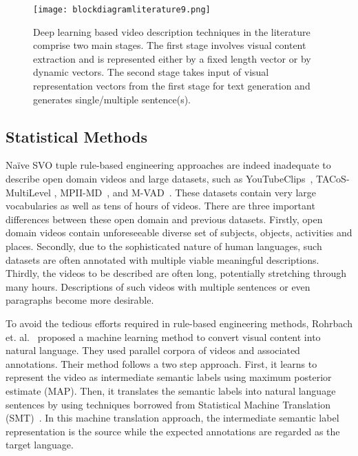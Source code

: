 \documentclass[10pt,journal,compsoc]{IEEEtran}
\begin{document}
\begin{figure*}[htbp] %
   \centering
   \texttt{[image: blockdiagramliterature9.png]} 
   \vspace{-2mm}
   \caption{Deep learning based video description techniques in the literature comprise two main stages. The first stage involves visual content extraction and is represented either by a fixed length vector or by dynamic vectors. The second stage takes input of visual representation vectors from the first stage for text generation and generates single/multiple sentence(s).}
   \label{fig:blockdia}
   \vspace{-3mm}
\end{figure*} 

\subsection{Statistical Methods}
\label{sec:statisticalmethods}
Na\"ive SVO tuple rule-based engineering approaches are indeed inadequate to describe open domain videos and large datasets, such as YouTubeClips~\cite{chen2010collecting}, TACoS-MultiLevel \cite{rohrbach2014coherent}, MPII-MD~\cite{rohrbach2015dataset}, and M-VAD~\cite{torabi2015using}.
These datasets contain very large vocabularies as well as tens of hours of videos. There are three important differences between 
these open domain and previous datasets. Firstly, open domain videos contain unforeseeable diverse set of subjects, objects, activities and places. Secondly, due to the sophisticated nature of human languages, such datasets are often annotated with multiple viable meaningful descriptions. Thirdly, the videos to be described are often long, potentially stretching through many hours. Descriptions of such videos with multiple sentences or even paragraphs become more desirable.
 
To avoid the tedious efforts required in rule-based engineering methods, Rohrbach et. al.~\cite{rohrbach2013translating} proposed a machine learning method to convert visual content into natural language. They used parallel corpora of videos and associated annotations. Their method follows a two step approach. First, it learns to represent the video as intermediate semantic labels using maximum posterior estimate (MAP). Then, it translates the semantic labels into natural language sentences by using techniques borrowed from Statistical Machine Translation (SMT)~\cite{koehn2007moses}.
In this machine translation approach, the intermediate semantic label representation is the source while the expected annotations are regarded as the target language.
\end{document}
